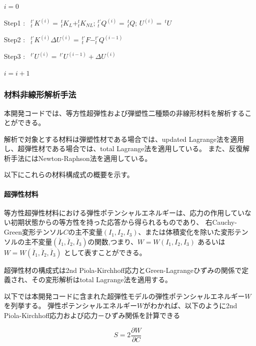 \documentclass[a4paper,pandoc,ja=standard]{bxjsarticle}
\let\oldparagraph\paragraph
\renewcommand{\paragraph}[1]{\oldparagraph{#1}\mbox{}}
\begin{document}
\(i = 0\)

Step1 :
\(\,\,\,^{t'}_t K^{(i)}=\,^{t}_t K_L+^{t}_t K_{NL};\,^{t'}_t Q^{(i)}=\, ^{t}_t Q;\, U^{(i)}=\,^{t} U\)

Step2 :
\(\,\,\,^{t'}_t K^{(i)} \Delta U^{(i)}=\, ^{t'}_t F - ^{t'}_t Q^{(i-1)}\)

Step3 :
\(\,\,\,^{t'} U^{(i)}=\, ^{t'} U^{(i-1)} + \Delta U^{(i)}\)

\(i = i + 1\)

\hypertarget{ux6750ux6599ux975eux7ddaux5f62ux89e3ux6790ux624bux6cd5}{%
\subsubsection{材料非線形解析手法}\label{ux6750ux6599ux975eux7ddaux5f62ux89e3ux6790ux624bux6cd5}}

本開発コードでは、等方性超弾性および弾塑性二種類の非線形材料を解析することができる。

解析で対象とする材料は弾塑性材である場合では、updated Lagrange法を適用し、超弾性材である場合では、total Lagrange法を適用している。
また、反復解析手法にはNewton-Raphson法を適用している。

以下にこれらの材料構成式の概要を示す。

\hypertarget{ux8d85ux5f3eux6027ux6750ux6599}{%
\paragraph{超弾性材料}\label{ux8d85ux5f3eux6027ux6750ux6599}}

等方性超弾性材料における弾性ポテンシャルエネルギーは、応力の作用していない初期状態からの等方性を持った応答から得られるものであり、
右Cauchy-Green変形テンソル\(C\)の主不変量\(( I_1, I_2, I_3 )\)、または体積変化を除いた変形テンソルの主不変量\((\overline{I}_1 , \overline{I}_2 , \overline{I}_3)\)の関数,つまり、\(W = W ( I_1, I_2, I_3 )\) あるいは \(W = W ( \overline{I}_1 , \overline{I}_2 , \overline{I}_3)\) として表すことができる。

超弾性材の構成式は2nd Piola-Kirchhoff応力とGreen-Lagrangeひずみの関係で定義され、その変形解析はtotal Lagrange法を適用する。

以下では本開発コードに含まれた超弾性モデルの弾性ポテンシャルエネルギー\(W\)を列挙する。
弾性ポテンシャルエネルギー\(W\)がわかれば、以下のように2nd Piola-Kirchhoff応力および応力－ひずみ関係を計算できる

\begin{equation}
S = 2\frac{\partial W}{\partial C}
\label{eq:2.2.33}
\end{equation}
\end{document}
